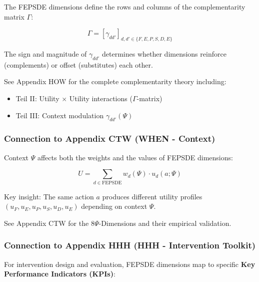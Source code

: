 The FEPSDE dimensions define the rows and columns of the complementarity 
matrix $\Gamma$:

\begin{equation}
\Gamma = [\gamma_{dd'}]_{d, d' \in \{F, E, P, S, D, E\}}
\end{equation}

The sign and magnitude of $\gamma_{dd'}$ determines whether dimensions 
reinforce (complements) or offset (substitutes) each other.

See Appendix HOW for the complete complementarity theory including:
\begin{itemize}
    \item Teil II: Utility $\times$ Utility interactions ($\Gamma$-matrix)
    \item Teil III: Context modulation $\gamma_{dd'}(\Psi)$
\end{itemize}

\subsubsection{Connection to Appendix CTW (WHEN - Context)}

Context $\Psi$ affects both the weights and the values of FEPSDE dimensions:

\begin{equation}
U = \sum_{d \in \text{FEPSDE}} w_d(\Psi) \cdot u_d(a; \Psi)
\end{equation}

Key insight: The same action $a$ produces different utility profiles 
$(u_F, u_E, u_P, u_S, u_D, u_E)$ depending on context $\Psi$.

See Appendix CTW for the 8$\Psi$-Dimensions and their empirical validation.

\subsubsection{Connection to Appendix HHH (HHH - Intervention Toolkit)}

For intervention design and evaluation, FEPSDE dimensions map to specific
\textbf{Key Performance Indicators (KPIs)}:

